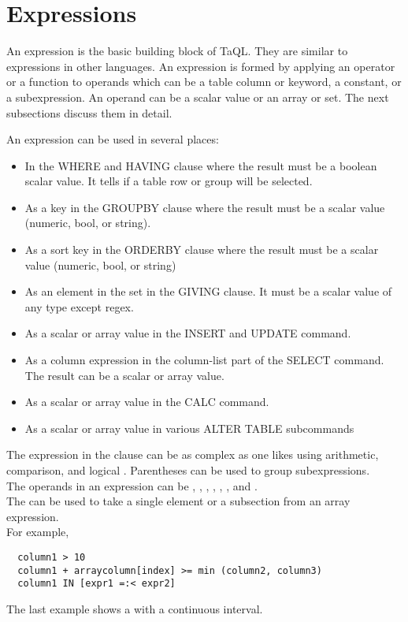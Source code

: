 \section{\label{TAQL:EXPRESSIONS}Expressions}
An expression is the basic building block of TaQL. They are similar to
expressions in other languages. An expression is formed by
applying an operator or a function to operands which can be
a table column or keyword, a constant, or a subexpression.
An operand can be a scalar value or an array or set.
The next subsections discuss them in detail.

An expression can be used in several places:
\begin{itemize}
\item In the WHERE and HAVING clause where the result must be a
  boolean scalar value.  It tells if a table row or group will be
  selected.
\item As a key in the GROUPBY clause where the result must be a scalar
  value (numeric, bool, or string).
\item As a sort key in the ORDERBY clause where the result must be a
  scalar value (numeric, bool, or string)
\item As an element in the set in the GIVING clause. It must be a
  scalar value of any type except regex.
\item As a scalar or array value in the INSERT and UPDATE command.
\item As a column expression in the column-list part of the SELECT
  command. The result can be a scalar or array value.
\item As a scalar or array value in the CALC command.
\item As a scalar or array value in various ALTER TABLE subcommands
\end{itemize}

The expression in the clause can be as complex as one likes using
arithmetic, comparison, and logical .
Parentheses can be used to group subexpressions.
\\The operands in an expression can be
,
,
,
,
,
, and
.
\\The {} can be used to take a
single element or a subsection from an array expression.
\\For example,
\begin{verbatim}
  column1 > 10
  column1 + arraycolumn[index] >= min (column2, column3)
  column1 IN [expr1 =:< expr2]
\end{verbatim}
The last example shows a  with a continuous interval.


